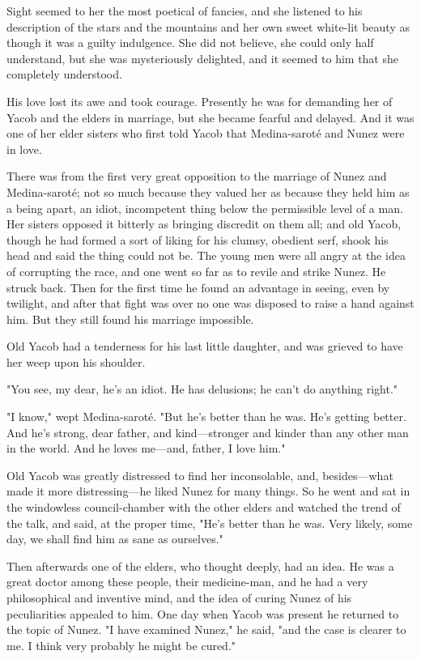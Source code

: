 \documentclass[courier]{sffms}
\begin{document}
Sight seemed to her the most poetical of fancies, and she listened to
his description of the stars and the mountains and her own sweet
white-lit beauty as though it was a guilty indulgence. She did not
believe, she could only half understand, but she was mysteriously
delighted, and it seemed to him that she completely understood.

His love lost its awe and took courage. Presently he was for demanding
her of Yacob and the elders in marriage, but she became fearful and
delayed. And it was one of her elder sisters who first told Yacob that
Medina-sarot\'e and Nunez were in love.

There was from the first very great opposition to the marriage of
Nunez and Medina-sarot\'e; not so much because they valued her as
because they held him as a being apart, an idiot, incompetent thing
below the permissible level of a man.  Her sisters opposed it bitterly
as bringing discredit on them all; and old Yacob, though he had formed
a sort of liking for his clumsy, obedient serf, shook his head and
said the thing could not be. The young men were all angry at the idea
of corrupting the race, and one went so far as to revile and strike
Nunez. He struck back. Then for the first time he found an advantage
in seeing, even by twilight, and after that fight was over no one was
disposed to raise a hand against him. But they still found his
marriage impossible.

Old Yacob had a tenderness for his last little daughter, and was
grieved to have her weep upon his shoulder.

"You see, my dear, he's an idiot. He has delusions; he can't do
anything right."

"I know," wept Medina-sarot\'e. "But he's better than he was. He's
getting better.  And he's strong, dear father, and kind---stronger and
kinder than any other man in the world. And he loves me---and, father,
I love him."

Old Yacob was greatly distressed to find her inconsolable, and,
besides---what made it more distressing---he liked Nunez for many
things. So he went and sat in the windowless council-chamber with the
other elders and watched the trend of the talk, and said, at the
proper time, "He's better than he was. Very likely, some day, we shall
find him as sane as ourselves."

Then afterwards one of the elders, who thought deeply, had an idea. He
was a great doctor among these people, their medicine-man, and he had
a very philosophical and inventive mind, and the idea of curing Nunez
of his peculiarities appealed to him. One day when Yacob was present
he returned to the topic of Nunez. "I have examined Nunez," he said,
"and the case is clearer to me. I think very probably he might be
cured."
\end{document}
